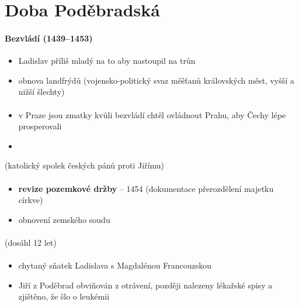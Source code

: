 \section{Doba Poděbradská}
\paragraph{Bezvládí (1439--1453)} 
\begin{itemize}
\item Ladislav příliš mladý na to aby nastoupil na trůn
\item obnova landfrýdů (vojensko-politický svaz měšťanů královských měst, vyšší a nižší šlechty)
\end{itemize}

\paragraph{}
\begin{itemize}
\item v Praze jsou zmatky kvůli bezvládí \ra chtěl ovládnout Prahu, aby Čechy lépe prosperovali
\item {}
\end{itemize}
\mbox{}
 (katolický spolek českých pánů proti Jiřímu)

\paragraph{}
\begin{itemize}
\item \textbf{revize pozemkové držby} -- 1454 (dokumentace přerozdělení majetku církve)
\item obnovení zemského soudu
\end{itemize}

\paragraph{} (dosáhl 12 let)

\paragraph{}
\begin{itemize}
\item chytaný sňatek Ladislava s Magdalénou Francouzskou
\item Jiří z Poděbrad obviňován z otrávení, později nalezeny lékařské spisy a zjištěno, že šlo o leukémii
\end{itemize}


